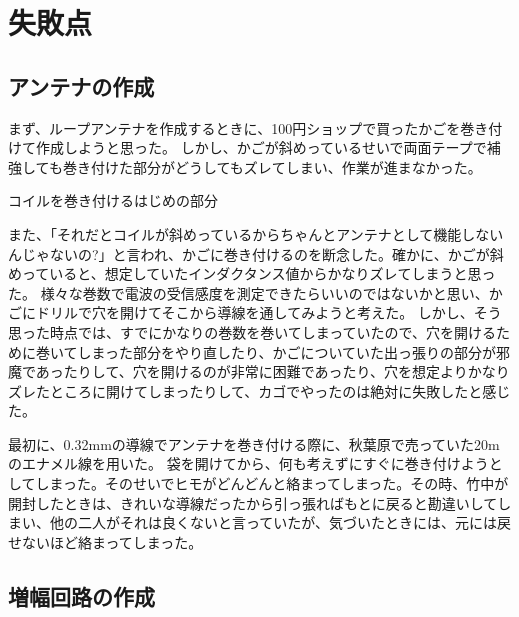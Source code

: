\documentclass[report.tex]{subfiles}
\begin{document}
\section{失敗点}

\subsection{アンテナの作成}

まず、ループアンテナを作成するときに、100円ショップで買ったかごを巻き付けて作成しようと思った。
しかし、かごが斜めっているせいで両面テープで補強しても巻き付けた部分がどうしてもズレてしまい、作業が進まなかった。

コイルを巻き付けるはじめの部分

また、「それだとコイルが斜めっているからちゃんとアンテナとして機能しないんじゃないの?」と言われ、かごに巻き付けるのを断念した。確かに、かごが斜めっていると、想定していたインダクタンス値からかなりズレてしまうと思った。
様々な巻数で電波の受信感度を測定できたらいいのではないかと思い、かごにドリルで穴を開けてそこから導線を通してみようと考えた。
しかし、そう思った時点では、すでにかなりの巻数を巻いてしまっていたので、穴を開けるために巻いてしまった部分をやり直したり、かごについていた出っ張りの部分が邪魔であったりして、穴を開けるのが非常に困難であったり、穴を想定よりかなりズレたところに開けてしまったりして、カゴでやったのは絶対に失敗したと感じた。

最初に、0.32mmの導線でアンテナを巻き付ける際に、秋葉原で売っていた20mのエナメル線を用いた。
袋を開けてから、何も考えずにすぐに巻き付けようとしてしまった。そのせいでヒモがどんどんと絡まってしまった。その時、竹中が開封したときは、きれいな導線だったから引っ張ればもとに戻ると勘違いしてしまい、他の二人がそれは良くないと言っていたが、気づいたときには、元には戻せないほど絡まってしまった。

\subsection{増幅回路の作成}
\end{document}
